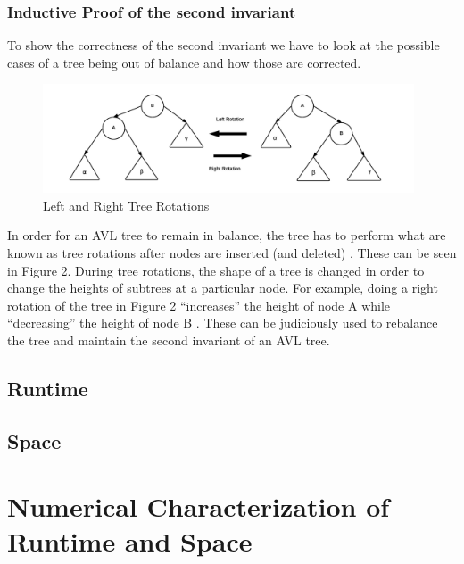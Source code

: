 \documentclass[12pt]{article}
\begin{document}
\subsubsection*{Inductive Proof of the second invariant}
To show the correctness of the second invariant we have to look at the possible
cases of a tree being out of balance and how those are corrected.
\begin{figure}[h]
\caption{Left and Right Tree Rotations}
\includegraphics[width=11cm]{tree_rotations.png}
\centering
\end{figure}
\noindent
In order for an AVL tree to remain in balance, the tree has to
perform what are known as tree rotations after nodes are inserted (and deleted)
\cite{wiki:avl}.
These can be seen in Figure 2.  During tree rotations, the shape of a tree is
changed in order to change the heights of subtrees
at a particular node.  For example, doing a right rotation of the tree in
Figure 2 ``increases'' the height of node A while ``decreasing'' the height of
node B \cite{wiki:tree-rotations}.  These can be judiciously used to rebalance
the tree and maintain the second invariant of an AVL tree.
  

\subsection*{Runtime}

\subsection*{Space}

\section*{Numerical Characterization of Runtime and Space}

\end{document}
